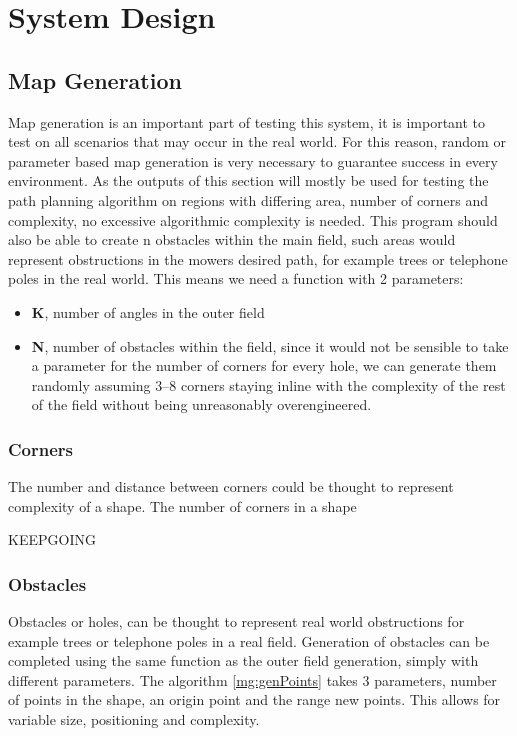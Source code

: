 \documentclass[final]{cmpreport_02}
\begin{document}
\section{System Design}

\subsection{Map Generation}
Map generation is an important part of testing this system, it is important to test on all scenarios that may occur in the real world.
For this reason, random or parameter based map generation is very necessary to guarantee success in every environment.
As the outputs of this section will mostly be used for testing the path planning algorithm on regions with differing area, number of corners and complexity, no excessive algorithmic complexity is needed.
This program should also be able to create n obstacles within the main field, such areas would represent obstructions in the mowers desired path, for example trees or telephone poles in the real world.
This means we need a function with 2 parameters:

\begin{itemize}
	\item \textbf{K}, number of angles in the outer field
	\item \textbf{N}, number of obstacles within the field, since it would not be sensible to take a parameter for the number of corners for every hole, we can generate them randomly assuming 3–8 corners staying inline with the complexity of the rest of the field without being unreasonably overengineered.
\end{itemize}


\subsubsection{Corners}
The number and distance between corners could be thought to represent complexity of a shape.
The number of corners in a shape

KEEPGOING

\subsubsection{Obstacles}
Obstacles or holes, can be thought to represent real world obstructions for example trees or telephone poles in a real field.
Generation of obstacles can be completed using the same function as the outer field generation, simply with different parameters.
The algorithm \ref{mg:genPoints} takes 3 parameters, number of points in the shape, an origin point and the range new points.
This allows for variable size, positioning and complexity.
\end{document}
